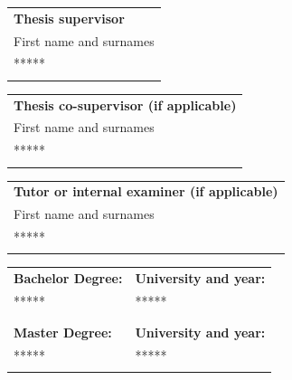 \begin{tabularx}{\textwidth}{l}
\\ \textbf{Thesis supervisor} \\
\Xhline{1\arrayrulewidth}
\small{First name and surnames} \\
\large{*****} \\
\Xhline{1\arrayrulewidth}
\end{tabularx}

\begin{tabularx}{\textwidth}{l}
\\ \textbf{Thesis co-supervisor (if applicable)} \\
\Xhline{1\arrayrulewidth}
\small{First name and surnames} \\
\large{*****} \\
\Xhline{1\arrayrulewidth}
\end{tabularx}

\begin{tabularx}{\textwidth}{l}
\\ \textbf{Tutor or internal examiner (if applicable)} \\
\Xhline{1\arrayrulewidth}
First name and surnames \\
\large{*****} \\
\Xhline{1\arrayrulewidth}
\end{tabularx}

\begin{tabularx}{\textwidth}{l l}
  \\ \textbf{Bachelor Degree: } & \textbf{University and year: } \\
  ***** & ***** \\ \\
  \\ \textbf{Master Degree: } & \textbf{University and year: } \\
  ***** & ***** \\
  \Xhline{1\arrayrulewidth}
  \end{tabularx}

\endinput